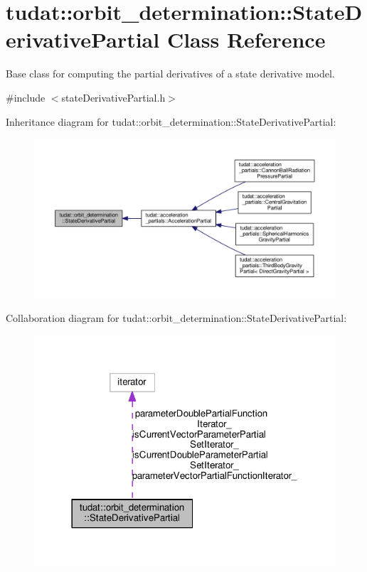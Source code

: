 \hypertarget{classtudat_1_1orbit__determination_1_1StateDerivativePartial}{}\section{tudat\+:\+:orbit\+\_\+determination\+:\+:State\+Derivative\+Partial Class Reference}
\label{classtudat_1_1orbit__determination_1_1StateDerivativePartial}


Base class for computing the partial derivatives of a state derivative model.  




{\ttfamily \#include $<$state\+Derivative\+Partial.\+h$>$}



Inheritance diagram for tudat\+:\+:orbit\+\_\+determination\+:\+:State\+Derivative\+Partial\+:
\nopagebreak
\begin{figure}[H]
\begin{center}
\leavevmode
\includegraphics[width=350pt]{classtudat_1_1orbit__determination_1_1StateDerivativePartial__inherit__graph}
\end{center}
\end{figure}


Collaboration diagram for tudat\+:\+:orbit\+\_\+determination\+:\+:State\+Derivative\+Partial\+:
\nopagebreak
\begin{figure}[H]
\begin{center}
\leavevmode
\includegraphics[width=318pt]{classtudat_1_1orbit__determination_1_1StateDerivativePartial__coll__graph}
\end{center}
\end{figure}
